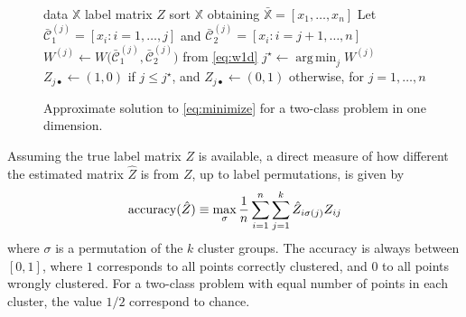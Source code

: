 \documentclass[aps,preprint,nofootinbib,floatfix]{revtex4-1}
\DeclareMathOperator*{\argmin}{arg\,min}
\newcommand\C{{\mathcal{C}}}
\begin{document}
\begin{figure}
\begin{algorithm}[H]\vspace{.5em}
\begin{algorithmic}[1]
\INPUT data $\mathbb{X}$
\OUTPUT label matrix $Z$
\STATE sort $\mathbb{X}$ obtaining 
$\bar{\mathbb{X}}= [ x_1,\dotsc,x_n ]$
        \STATE Let $\bar{\C}_1^{(j)} = [x_i: i=1,\dotsc,j]$ and 
                $\bar{\C}_2^{(j)} = [x_i : i=j+1,\dotsc,n]$
        \STATE  
            $W^{(j)} \leftarrow W \big( \bar{\C}_1^{(j)},\bar{\C}_2^{(j)}  
            \big)$ from \eqref{eq:w1d}
    \ENDFOR
    \STATE $j^\star \leftarrow \argmin_j W^{(j)}$ 
    \STATE $Z_{j\bullet} \leftarrow (1,0) $ if $j\le j^\star$, and
           $Z_{j\bullet} \leftarrow (0,1)$ otherwise, for $j=1,\dotsc,n$
\end{algorithmic}
\caption{
\label{algo1d}
Approximate solution to \eqref{eq:minimize} 
for a two-class problem in one dimension. \hspace{\fill}
}
\end{algorithm}
\end{figure}

Assuming the true label matrix $Z$ is available, a direct
measure of how different the estimated matrix $\hat{Z}$ 
is from $Z$, up to label
permutations, is given by
\begin{equation}
\label{eq:accuracy}
\textnormal{accuracy}(\hat{Z}) \equiv \max_\sigma
\dfrac{1}{n}\sum_{i=1}^n\sum_{j=1}^k \hat{Z}_{i \sigma(j)} Z_{ij}
\end{equation}
where $\sigma$ is a permutation
of the $k$ cluster groups. 
The accuracy is always between $[0,1]$, where
$1$ corresponds to all points correctly clustered, and 
$0$ to all points wrongly clustered.
For a two-class problem with equal
number of points in each cluster, the value $1/2$ correspond
to chance.
\end{document}
